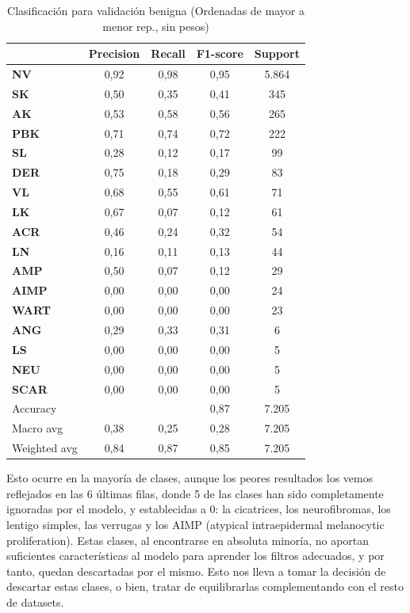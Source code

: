 \begin{table}[!ht]
	\centering
	\begin{tabular}{|l|c|c|c|c|}
		\hline
		& Precision & Recall & F1-score & Support \\
		\hline
		\textbf{NV} & 0,92 & 0,98 & 0,95 & 5.864 \\ \hline
		\textbf{SK} & 0,50 & 0,35 & 0,41 & 345 \\ \hline
		\textbf{AK} & 0,53 & 0,58 & 0,56 & 265 \\ \hline
		\textbf{PBK} & 0,71 & 0,74 & 0,72 & 222 \\ \hline
		\textbf{SL} & 0,28 & 0,12 & 0,17 & 99 \\ \hline
		\textbf{DER} & 0,75 & 0,18 & 0,29 & 83 \\ \hline
		\textbf{VL} & 0,68 & 0,55 & 0,61 & 71 \\ \hline
		\textbf{LK} & 0,67 & 0,07 & 0,12 & 61 \\ \hline
		\textbf{ACR} & 0,46 & 0,24 & 0,32 & 54 \\ \hline
		\textbf{LN} & 0,16 & 0,11 & 0,13 & 44 \\ \hline
		\textbf{AMP} & 0,50 & 0,07 & 0,12 & 29 \\ \hline
		\textbf{AIMP} & 0,00 & 0,00 & 0,00 & 24 \\ \hline
		\textbf{WART} & 0,00 & 0,00 & 0,00 & 23 \\ \hline
		\textbf{ANG} & 0,29 & 0,33 & 0,31 & 6 \\ \hline
		\textbf{LS} & 0,00 & 0,00 & 0,00 & 5 \\ \hline
		\textbf{NEU} & 0,00 & 0,00 & 0,00 & 5 \\ \hline
		\textbf{SCAR} & 0,00 & 0,00 & 0,00 & 5 \\ \hline
		\hline
		Accuracy &  &  & 0,87 & 7.205 \\
		Macro avg & 0,38& 0,25& 0,28&7.205\\
		Weighted avg&0,84&0,87&0,85&7.205\\
		\hline
	\end{tabular}
		\caption{Clasificación para validación benigna (Ordenadas de mayor a menor rep., sin pesos)}
	\label{tab:benignomalmetrics}
\end{table}

Esto ocurre en la mayoría de clases, aunque los peores resultados los vemos reflejados en las 6 últimas filas, donde 5 de las clases han sido completamente ignoradas por el modelo, y establecidas a 0: la cicatrices, los neurofibromas, los lentigo simples, las verrugas y los AIMP (atypical intraepidermal melanocytic proliferation). Estas clases, al encontrarse en absoluta minoría, no aportan suficientes características al modelo para aprender los filtros adecuados, y por tanto, quedan descartadas por el mismo. Esto nos lleva a tomar la decisión de descartar estas clases, o bien, tratar de equilibrarlas complementando con el resto de datasets.

